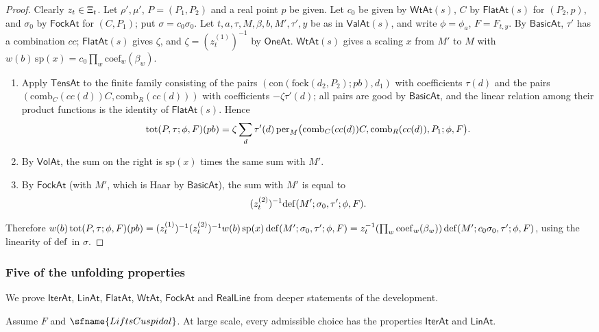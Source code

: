 \begin{proof}
Clearly $z_t\in\Xi_t$. Let $\rho',\mu'$, $P=(P_1,P_2)$ and a real point $p$ be given. Let $c_0$ be given by
$\mathsf{WtAt}(s)$, $C$ by $\mathsf{FlatAt}(s)$ for $(P_2,p)$, and $\sigma_0$ by $\mathsf{FockAt}$ for $(C,P_1)$; put
$\sigma=c_0\sigma_0$. Let $t,a,\tau,M,\beta,b,M',\tau',y$ be as in $\mathsf{ValAt}(s)$, and write $\phi=\phi_a$,
$F=F_{t,y}$. By $\mathsf{BasicAt}$, $\tau'$ has a combination $cc$; $\mathsf{FlatAt}(s)$ gives $\zeta$, and $\zeta=(z^{(1)}_t)^{-1}$
by $\mathsf{OneAt}$. $\mathsf{WtAt}(s)$ gives a scaling $x$ from $M'$ to $M$ with $w(b)\,\mathrm{sp}(x)=c_0\prod_w\mathrm{coef}_w(\beta_w)$.
\begin{enumerate}[label=(\arabic*)]
\item Apply $\mathsf{TensAt}$ to the finite family consisting of the pairs $(\mathrm{con}(\mathrm{fock}(d_2,P_2);pb),d_1)$ with
coefficients $\tau(d)$ and the pairs $(\mathrm{comb}_C(cc(d))C,\mathrm{comb}_R(cc(d)))$ with coefficients $-\zeta\tau'(d)$; all
pairs are good by $\mathsf{BasicAt}$, and the linear relation among their product functions is the identity of
$\mathsf{FlatAt}(s)$. Hence
\[
\mathrm{tot}(P,\tau;\phi,F)(pb)=\zeta\sum_d\tau'(d)\,\mathrm{per}_M\bigl(\mathrm{comb}_C(cc(d))C,\mathrm{comb}_R(cc(d)),P_1;\phi,F\bigr).
\]
\item By $\mathsf{VolAt}$, the sum on the right is $\mathrm{sp}(x)$ times the same sum with $M'$.
\item By $\mathsf{FockAt}$ (with $M'$, which is Haar by $\mathsf{BasicAt}$), the sum with $M'$ is equal to
\[
(z^{(2)}_t)^{-1}\mathrm{def}(M';\sigma_0,\tau';\phi,F).
\]
\end{enumerate}
Therefore $w(b)\,\mathrm{tot}(P,\tau;\phi,F)(pb)=(z^{(1)}_t)^{-1}(z^{(2)}_t)^{-1}w(b)\,\mathrm{sp}(x)\,\mathrm{def}(M';\sigma_0,\tau';\phi,F)
=z_t^{-1}(\prod_w\mathrm{coef}_w(\beta_w))\,\mathrm{def}(M';c_0\sigma_0,\tau';\phi,F)$, using the linearity of $\mathrm{def}$ in $\sigma$.
\end{proof}

\subsubsection{Five of the unfolding properties}
We prove $\mathsf{IterAt}$, $\mathsf{LinAt}$, $\mathsf{FlatAt}$, $\mathsf{WtAt}$, $\mathsf{FockAt}$ and $\mathsf{RealLine}$ from
deeper statements of the development.

\begin{proposition}\label{pf:rowprops:iterat}
Assume $F$ and $\sfname{LiftsCuspidal}$. At large scale, every admissible choice has the properties $\mathsf{IterAt}$ and
$\mathsf{LinAt}$.
\end{proposition}

